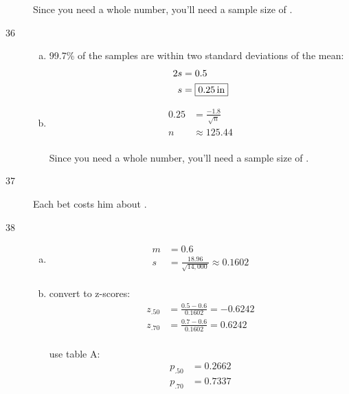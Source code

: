 \documentclass[letterpaper, landscape]{exam}
\newcommand{\cent}{\textcent\xspace}
\begin{document}
\begin{description}
        Since you need a whole number, you'll need a sample size of 
        .

      \item[36]
        \begin{enumerate}[(a)]
          \item 99.7\% of the samples are within two standard deviations of the
            mean:
            \begin{align*}
              2s & = 0.5 \\
              s  & = \boxed{ \unit[0.25]{in} } \\
            \end{align*}

          \item 
            \begin{align*}
              0.25 & = \frac{-1.8}{\sqrt{n}} \\
              n    & \approx 125.44 \\
            \end{align*}

            Since you need a whole number, you'll need a sample size of 
            .
        \end{enumerate}

      \item[37] Each bet costs him about \fbox{ 40\cent }.

      \item[38]
        \begin{enumerate}[(a)]
          \item 
            \begin{align*}
              m &= \boxed{ 0.6 } \\
              s &= \frac{18.96}{\sqrt{14,000}} \approx \boxed{ 0.1602 } \\
            \end{align*}
            
          \item
            convert to z-scores:
            \begin{align*}
              z_{.50} &= \frac{0.5 - 0.6}{0.1602} = -0.6242 \\
              z_{.70} &= \frac{0.7 - 0.6}{0.1602} = 0.6242 \\
            \end{align*}

            use table A:
            \begin{align*}
              p_{.50} &= 0.2662 \\
              p_{.70} &= 0.7337 \\
            \end{align*}


\end{enumerate}
\end{description}
\end{document}
